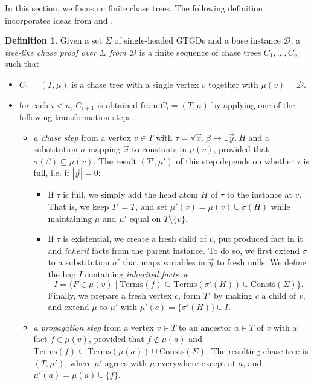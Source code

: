 \documentclass[12pt]{report}
\theoremstyle{plain}
\theoremstyle{definition}
\newtheorem{definition}[theorem]{Definition}
\def\Consts{{\mathrm{Consts}}}
\def\Terms{{\mathrm{Terms}}}
\begin{document}
In this section, we focus on finite chase trees. The following definition incorporates ideas from \cite{benedikt_buron_germano_kappelmann_motik_2022} and \cite{kappelmann_2019}.

\begin{definition}
\label{tree-like-chase-proof}
  Given a set $\Sigma$ of single-headed GTGDs and a base instance $\mathcal{D}$, a \emph{tree-like chase proof over $\Sigma$ from $\mathcal{D}$} is a finite sequence of chase trees $C_1, \ldots, C_n$ such that
  \begin{itemize}
    \item $C_1 = (T, \mu)$ is a chase tree with a single vertex $v$ together with $\mu(v) = \mathcal{D}$.
    \item for each $i < n$, $C_{i + 1}$ is obtained from $C_i = (T, \mu)$ by applying one of the following transformation steps.
    \begin{itemize}
      \item \emph{a chase step} from a vertex $v \in T$ with $\tau = \forall \vec{x}.\ \beta \rightarrow \exists \vec{y}.\ H$ and a substitution $\sigma$ mapping $\vec{x}$ to constants in $\mu(v)$, provided that $\sigma(\beta) \subseteq \mu(v)$. The result $(T', \mu')$ of this step depends on whether $\tau$ is full, i.e. if $|\vec{y}| = 0$:
      \begin{itemize}
        \item If $\tau$ is full, we simply add the head atom $H$ of $\tau$ to the instance at $v$. That is, we keep $T' = T$, and set $\mu'(v) = \mu(v) \cup \sigma(H)$ while maintaining $\mu$ and $\mu'$ equal on $T \setminus \{v\}$.
        \item If $\tau$ is existential, we create a fresh child of $v$, put produced fact in it and \emph{inherit} facts from the parent instance. To do so, we first extend $\sigma$ to a substitution $\sigma'$ that maps variables in $\vec{y}$ to fresh nulls. We define the bag $I$ containing \emph{inherited facts} as $$I = \{ F \in \mu(v) \mid \Terms(f) \subseteq \Terms(\sigma'(H)) \cup \Consts(\Sigma) \}.$$ Finally, we prepare a fresh vertex $c$, form $T'$ by making $c$ a child of $v$, and extend $\mu$ to $\mu'$ with $\mu'(c) = \{\sigma'(H)\} \cup I$.
      \end{itemize}
      \item \emph{a propagation step} from a vertex $v \in T$ to an ancestor $a \in T$ of $v$ with a fact $f \in \mu(v)$, provided that $f \not\in \mu(a)$ and $\Terms(f) \subseteq \Terms(\mu(a)) \cup \Consts(\Sigma)$. The resulting chase tree is $(T, \mu')$, where $\mu'$ agrees with $\mu$ everywhere except at $a$, and $\mu'(a) = \mu(a) \cup \{f\}$.
    \end{itemize}
  \end{itemize}
\end{definition}
\end{document}
